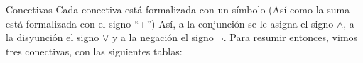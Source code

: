 \begin{frame}{Conectivas}
  Cada conectiva está formalizada con un símbolo (Así como la suma está
  formalizada con el signo ``+'')
  \jump
  Así, a la conjunción se le asigna el signo $\land$, a la disyunción el signo
  $\lor$ y a la negación el signo $\lnot$.
  \jump
  Para resumir entonces, vimos tres conectivas, con las siguientes tablas:
  \jump
  \begin{columns}
  \end{columns}
\end{frame}


